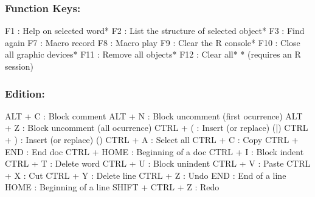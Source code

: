 \subsubsection{Function Keys:}

\vspace{-0.5cm}
\begin{Rtables}[caption={[Function keys]
    Function keys},
  label=hotkey:function]
  F1                      : Help on selected word*
  F2                      : List the structure of selected object*
  F3                      : Find again
  F7                      : Macro record
  F8                      : Macro play
  F9                      : Clear the R console*
  F10                     : Close all graphic devices*
  F11                     : Remove all objects*
  F12                     : Clear all*
  * (requires an R session)
\end{Rtables}


\newpage
\subsubsection{Edition:}

\vspace{-0.5cm}
\begin{Rtables}[caption={[Edition keyboard shortcuts]
    Edition keyboard shortcuts},
  label=hotkey:editions]
  ALT   + C               : Block comment
  ALT   + N               : Block uncomment (first ocurrence)
  ALT   + Z               : Block uncomment (all ocurrence)
  CTRL  + (               : Insert (or replace) (|)
  CTRL  + )               : Insert (or replace) ()
  CTRL  + A               : Select all
  CTRL  + C               : Copy
  CTRL  + END             : End doc
  CTRL  + HOME            : Beginning of a doc
  CTRL  + I               : Block indent
  CTRL  + T               : Delete word
  CTRL  + U               : Block unindent
  CTRL  + V               : Paste
  CTRL  + X               : Cut
  CTRL  + Y               : Delete line
  CTRL  + Z               : Undo
  END                     : End of a line
  HOME                    : Beginning of a line
  SHIFT + CTRL + Z        : Redo
\end{Rtables}



